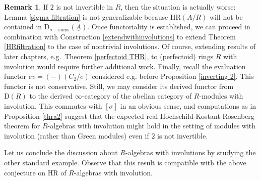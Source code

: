 \documentclass[10pt]{amsart}
\theoremstyle{definition}
\newtheorem{rmk}[thm]{Remark}
\numberwithin{equation}{section}
\newcommand{\rD}{\mathrm{D}}
\newcommand{\ul}{\underline}
\newcommand{\HR}{\mathrm{HR}}
\begin{document}
\begin{rmk}
If $2$ is not invertible in $R$, then the situation is actually worse:
Lemma \ref{sigma filtration} is not generalizable because $\HR(A/R)$ will not be contained in $\rD_{\sigma-\mathrm{sums}}(\ul{A})$.
Once functoriality is established, we can proceed
in combination with Construction 
\ref{extendwithinvolutions} to extend Theorem \ref{HRfiltration} to the case of nontrivial involutions.
Of course, extending results of later chapters, e.g.\ Theorem \ref{perfectoid THR}, to (perfectoid) rings $R$ with involution would require further additional work.
Finally, recall the evaluation functor $ev=(-)(C_2/e)$ considered e.g. before Proposition \ref{inverting 2}. This functor is not conservative. Still, we may consider its derived functor from $\rD(\ul{R})$ to the derived $\infty$-category of the abelian category of $R$-modules with involution. This commutes with $[\sigma]$ in an obvious sense, and computations as in Proposition \ref{thra2} suggest that the expected real Hochschild-Kostant-Rosenberg theorem for $R$-algebras with involution might hold in the setting of modules with involution (rather than Green modules) even if $2$ is not invertible.
\end{rmk}

Let us conclude the discussion about $R$-algebras with involutions by studying the other standard example. Observe that this result is compatible with the above conjecture on $\HR$ of $R$-algebras with involution.
\end{document}
